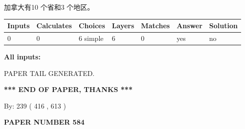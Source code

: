 \documentclass{ctexart}
\begin{document}
 
加拿大有10 个省和3 个地区。
 
 
\noindent{}
 
 
   
   
   
   
\noindent\begin{tabular}{|l|l|l|l|l|l|l|}
 \hline
Inputs & Calculates & Choices & Layers & Matches & Answer & Solution \\ \hline
 0  & 
 0  & 
 6
  simple  
  & 
 6  & 
 0  & 
  yes & 
  no 
  \\ \hline
 \end{tabular}
   
   
   
   
\noindent{}
   
   
   
   
\noindent\vspace{0.1in}\hspace{-0.08in} {\textbf{\Large{All inputs: }}}
   
   
   
   
   
   
 \vspace{0.2in}
 
   
   
\vspace{2.0in} PAPER TAIL GENERATED.
   
   
   
   
\vspace{1.0in} 
{\textbf{\large{ *** END OF PAPER, THANKS *** }}} 
   
   
\hspace{1.0in} By: 
 239 ( 416 ,  613 )
   
   
   
   
\newpage 
\setcounter{page}{ 
   584001 } 
   
   
   
   
 {\textbf{ \Large{ PAPER NUMBER  584  }}}
   
   
\vspace{0.2in}
   
   
   
   
   
   
   
\end{document}
